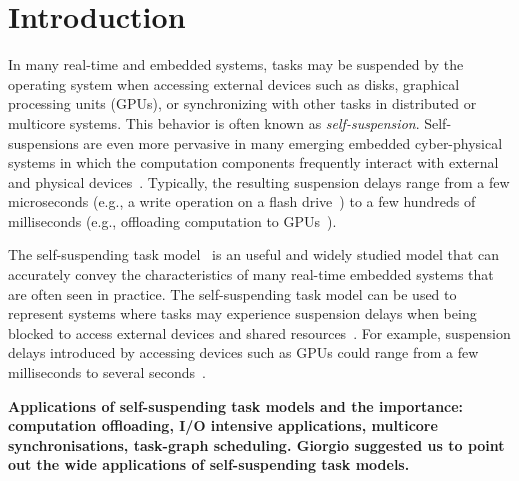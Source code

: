 \section{Introduction}

In many real-time and embedded systems, tasks may be suspended by the operating system when accessing external devices such as disks, graphical processing units (GPUs), or synchronizing with other tasks in distributed or multicore systems. 
This behavior is often known as \emph{self-suspension}. Self-suspensions are even more pervasive in many emerging embedded cyber-physical systems in which the computation components frequently interact with external and physical devices~\cite{Kang:rtss07,Kato_2011}. Typically, the resulting suspension delays range from a few microseconds (e.g., a write operation on a flash drive~\cite{Kang:rtss07}) to a few hundreds of milliseconds (e.g., offloading computation to GPUs~\cite{Kato_2011,Liu_2014}).

The self-suspending task model~\cite{LA:rtss09} is an useful and widely studied model that can accurately convey the characteristics of many real-time embedded systems that are often seen in practice. The self-suspending task model can be used to represent systems where tasks may experience suspension delays when being blocked to access external devices and shared resources~\cite{Chen:DAC2014, LA:rtas10, LA:rtcsa10, LA:rtss12}. For example, suspension delays introduced by accessing devices such as GPUs could range from a few milliseconds to several seconds~\cite{Kato:rtss11}. 

\textbf{Applications of self-suspending task models and the importance: computation offloading, I/O intensive applications, multicore synchronisations, task-graph scheduling. Giorgio suggested us to point out the wide applications of self-suspending task models.}
  
  